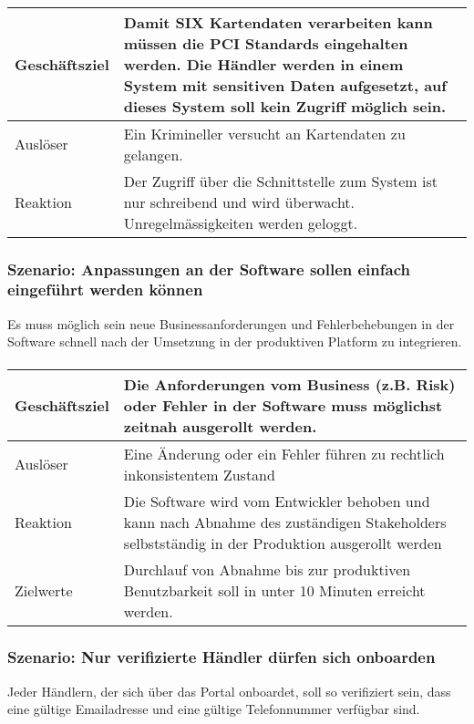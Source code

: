 \paragraph{}
\begin{tabular}{l|l}
\hline
Geschäftsziel & Damit SIX Kartendaten verarbeiten kann müssen die PCI Standards eingehalten werden. Die Händler werden in einem System mit sensitiven Daten aufgesetzt, auf dieses System soll kein Zugriff möglich sein. \\ \hline
Auslöser & Ein Krimineller versucht an Kartendaten zu gelangen. \\ \hline
Reaktion & Der Zugriff über die Schnittstelle zum System ist nur schreibend und wird überwacht. Unregelmässigkeiten werden geloggt.
\\ \hline
\end{tabular}

\subsubsection{Szenario: Anpassungen an der Software sollen einfach eingeführt werden können}

Es muss möglich sein neue Businessanforderungen und Fehlerbehebungen in der Software schnell nach der Umsetzung in der produktiven Platform zu integrieren. 
\paragraph{}
\begin{tabular}{l|l}
\hline
Geschäftsziel & Die Anforderungen vom Business (z.B. Risk) oder Fehler in der Software muss möglichst zeitnah ausgerollt werden. \\ \hline
Auslöser & Eine Änderung oder ein Fehler führen zu rechtlich inkonsistentem Zustand \\ 
\hline
Reaktion & Die Software wird vom Entwickler behoben und kann nach Abnahme des zuständigen Stakeholders selbstständig in der Produktion ausgerollt werden \\ 
\hline
Zielwerte & Durchlauf von Abnahme bis zur produktiven Benutzbarkeit soll in unter 10 Minuten erreicht werden.
\\ \hline
\end{tabular}

\subsubsection{Szenario: Nur verifizierte Händler dürfen sich onboarden}
Jeder Händlern, der sich über das Portal onboardet, soll so verifiziert sein, dass eine gültige Emailadresse und eine gültige Telefonnummer verfügbar sind.
